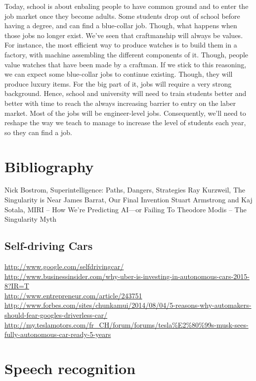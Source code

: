 \documentclass[12pt]{article}
\begin{document}
{Today, school is about enbaling people to have common ground and to enter the job market once they become adults. Some students drop out of school before having a degree, and can find a blue-collar job. Though, what happens when those jobs no longer exist.
We've seen that craftmanship will always be values. For instance, the most efficient way to produce watches is to build them in a factory, with machine assembling the different components of it. Though, people value watches that have been made by a craftman. If we stick to this reasoning, we can expect some blue-collar jobs to continue existing. Though, they will produce luxury items.
For the big part of it, jobs will require a very strong background. Hence, school and university will need to train students better and better with time to reach the always increasing barrier to entry on the laber market. Most of the jobs will be engineer-level jobs.
Consequently, we'll need to reshape the way we teach to manage to increase the level of students each year, so they can find a job.


\section{Bibliography}
Nick Bostrom, Superintelligence: Paths, Dangers, Strategies
Ray Kurzweil, The Singularity is Near
James Barrat, Our Final Invention
Stuart Armstrong and Kaj Sotala, MIRI – How We’re Predicting AI—or Failing To
Theodore Modis – The Singularity Myth

\subsection{Self-driving Cars}
\url{http://www.google.com/selfdrivingcar/}\\
\url{http://www.businessinsider.com/why-uber-is-investing-in-autonomous-cars-2015-8?IR=T}\\
\url{http://www.entrepreneur.com/article/243751}\\
\url{http://www.forbes.com/sites/chunkamui/2014/08/04/5-reasons-why-automakers-should-fear-googles-driverless-car/}\\
\url{http://my.teslamotors.com/fr_CH/forum/forums/tesla%E2%80%99s-musk-sees-fully-autonomous-car-ready-5-years}\\

\section{Speech recognition}


}
\end{document}
